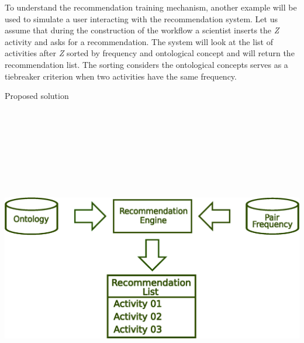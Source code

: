 \documentclass[a0, portrait]{a0poster}
\begin{document}
\begin{multicols}{2}
To understand the recommendation training mechanism, another example will be used to simulate a user interacting with the recommendation system. Let us assume that during the construction of the workflow a scientist inserts the \emph{Z} activity and asks for a recommendation. The system will look at the list of activities after \emph{Z} sorted by frequency and ontological concept and will return the recommendation list. The sorting considers the ontological concepts serves as a tiebreaker criterion when two activities have the same frequency.
\vspace{0.5cm}
\begin{center}
\Large  \color{darkgreen} Proposed solution \\
\vspace{0.5cm}
\includegraphics[height=15cm, width=28cm]{novos/engineVerdeForte.eps}
\end{center}
\vspace{0.5cm}



\end{multicols}
\end{document}
